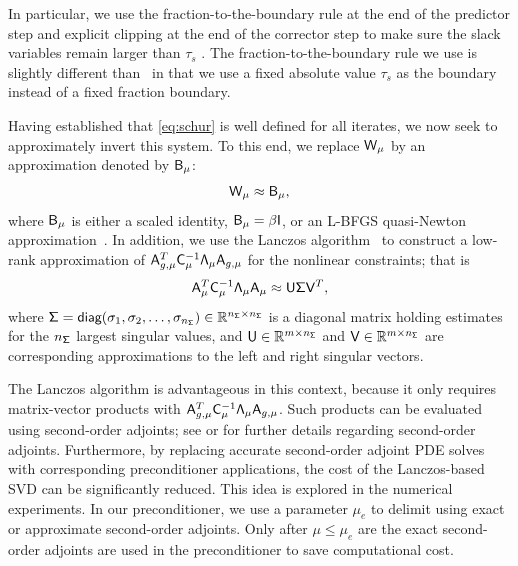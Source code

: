 In particular, we use the fraction-to-the-boundary rule 
at the end of the predictor step and explicit clipping at the end of the corrector step to make sure 
the slack variables remain larger than $\tau_s$ . 
The fraction-to-the-boundary rule we use is slightly 
different than~\cite{Nocedal2006NO} in that we use a fixed absolute value $\tau_s$ as the boundary 
instead of a fixed fraction boundary. 


Having established that \eqref{eq:schur} is well defined for all iterates, we
now seek to approximately invert this system.  To this end, we replace
$\mathsf{W}_{\mu}$ by an approximation denoted by $\mathsf{B}_{\mu}$:
\begin{equation*}
\mathsf{W}_{\mu} \approx \mathsf{B}_{\mu},
\end{equation*}
where $\mathsf{B}_{\mu}$ is either a scaled identity, $\mathsf{B}_{\mu} = \beta
\mathsf{I}$, or an L-BFGS quasi-Newton approximation~\cite{liu:1989}.  In addition,
we use the Lanczos algorithm~\cite{saad:1992} to construct a low-rank
approximation of $\mathsf{A}_{g,\mu}^T \mathsf{C}_\mu^{-1} \mathsf{\Lambda}_\mu
\mathsf{A}_{g,\mu}$ for the nonlinear constraints; that is
\begin{equation}\label{eq:svd}
  \mathsf{A}_\mu^T  \mathsf{C}_\mu^{-1}  \mathsf{\Lambda}_{\mu}\mathsf{A}_\mu
  \approx \mathsf{U} \mathsf{\Sigma} \mathsf{V}^T,
\end{equation}
where $\mathsf{\Sigma} = \textsf{diag}(\sigma_1,\sigma_2,\ldots,\sigma_{n_{\mathsf{\Sigma}}}) \in
\mathbb{R}^{n_{\mathsf{\Sigma}}\times n_{\mathsf{\Sigma}}}$ is a diagonal matrix holding estimates for the
$n_{\mathsf{\Sigma}}$ largest singular values, and $\mathsf{U} \in \mathbb{R}^{m\times n_{\mathsf{\Sigma}}}$ and
$\mathsf{V} \in \mathbb{R}^{m\times n_{\mathsf{\Sigma}}}$ are corresponding approximations to the
left and right singular vectors. 

\begin{remark}
  The Lanczos algorithm is advantageous in this context, because it only
  requires matrix-vector products with $\mathsf{A}_{g,\mu}^T \mathsf{C}_\mu^{-1}
  \mathsf{\Lambda}_\mu \mathsf{A}_{g,\mu}$.  Such products can be evaluated using
  second-order adjoints; see \cite{hicken:inexact2014} or
  \cite{dener:scitech2015} for further details regarding second-order adjoints.
  Furthermore, by replacing accurate second-order adjoint PDE solves with
  corresponding preconditioner applications, the cost of the Lanczos-based SVD
  can be significantly reduced.  This idea is explored in the numerical
  experiments.  In our preconditioner, we use a parameter $\mu_e$ 
   to delimit using exact or approximate second-order adjoints. Only after 
   $\mu \leq \mu_e $ are the exact second-order adjoints are used in the preconditioner 
   to save computational cost. 
\end{remark}

